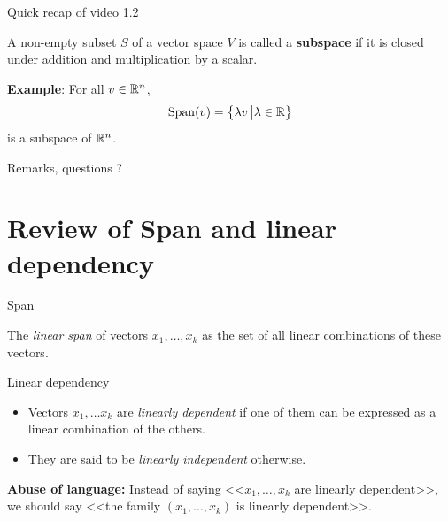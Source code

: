 \documentclass{beamer}
\begin{document}
\begin{frame}[t]{Quick recap of video 1.2}
	\grid
	\vspace{-0.7cm}
	\begin{exampleblock}{}
		A non-empty subset $S$ of a vector space $V$ is called a \textbf{subspace} if it is closed under addition and multiplication by a scalar.
	\end{exampleblock}
	\textbf{Example}: For all $v \in \mathbb{R}^n$, 
	$$
	{{\rm Span}}(v) = \big\{ \lambda v \, \big| \lambda \in \mathbb{R} \big\}
	$$
	is a subspace of $\mathbb{R}^n$.
\end{frame}


\begin{frame}[t]{Remarks, questions ?}
	\grid
	\pause
\end{frame}


\section{Review of Span and linear dependency}

\begin{frame}[t]{Span}
	\grid
	\vspace{-0.5cm}
	\begin{exampleblock}{}
		The \emph{linear span} of vectors $x_1, \dots, x_k$ as the set of all linear combinations of these vectors.
	\end{exampleblock}
\end{frame}

\begin{frame}[t]{Linear dependency}
	\grid
	\vspace{-0.5cm}
	\begin{exampleblock}{}
		\begin{itemize}
			\item Vectors $x_1, \dots x_k$ are \emph{linearly dependent} if one of them can be expressed as a linear combination of the others.
			\item They are said to be \emph{linearly independent} otherwise.
		\end{itemize}
	\end{exampleblock}
	\textbf{Abuse of language:} Instead of saying <<$x_1, \dots, x_k$ are linearly dependent>>, we should say <<the family $(x_1, \dots, x_k)$ is linearly dependent>>.
\end{frame}
\end{document}

